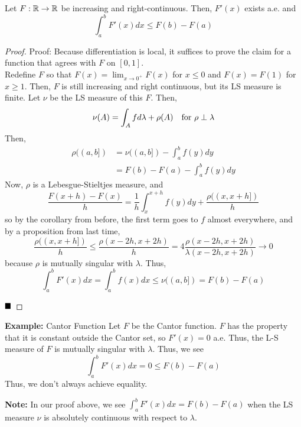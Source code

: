 
\begin{lemma}
    Let $F : \R \to \R$ be increasing and right-continuous. Then, $F'(x)$ exists a.e. and
    \[ \int_{a}^{b} F'(x) dx \leq F(b) - F(a) \]
\end{lemma}
\begin{proof}{Proof:}
    Because differentiation is local, it suffices to prove the claim for a function that agrees with $F$ on $[0, 1]$.\\

    Redefine $F$ so that $F(x) = \lim_{x \to 0^{+}} F(x)$ for $x \leq 0$ and $F(x) = F(1)$ for $x \geq 1$. Then,
    $F$ is still increasing and right continuous, but its LS measure is finite. Let $\nu$ be the LS measure of this $F$. Then,
    \[ \nu(A) = \int_{A} f d\lambda + \rho(A) \quad \tt{for } \rho \perp \lambda \]
    Then,
    \begin{align*}
        \rho((a, b]) &= \nu((a, b]) - \int_{a}^{b} f(y) dy\\
        &= F(b) - F(a) - \int_{a}^{b} f(y) dy
    \end{align*}
    Now, $\rho$ is a Lebesgue-Stieltjes measure, and
    \[ \frac{F(x + h) - F(x)}{h} = \frac{1}{h}\int_{x}^{x + h} f(y) dy + \frac{\rho((x, x + h])}{h} \]
    so by the corollary from before, the first term goes to $f$ almost everywhere, and by a proposition from last time,
    \[ \frac{\rho((x, x + h])}{h} \leq \frac{\rho(x - 2h, x + 2h)}{h} = 4\frac{\rho(x - 2h, x + 2h)}{\lambda(x - 2h, x + 2h)} \to 0 \]
    because $\rho$ is mutually singular with $\lambda$. Thus,
    \[ \int_{a}^{b} F'(x) dx = \int_{a}^{b} f(x) dx \leq \nu((a, b]) = F(b) - F(a) \]

    $\qed$
\end{proof}

\begin{example}{\textbf{Example:} Cantor Function}
    Let $F$ be the Cantor function. $F$ has the property that it is constant outside the Cantor set, so $F'(x) = 0$ a.e. Thus, the L-S measure of $F$ is mutually singular with $\lambda$. Thus, we see
    \[ \int_{a}^{b} F'(x) dx = 0 \leq F(b) - F(a) \]
    Thus, we don't always achieve equality.
\end{example}

\textbf{Note:} In our proof above, we see $\int_{a}^{b} F'(x) dx = F(b) - F(a)$ when the LS measure $\nu$ is absolutely continuous with respect to $\lambda$.

